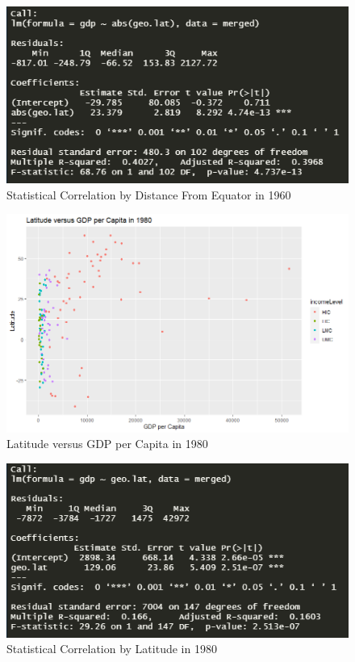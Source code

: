 \documentclass[15pt]{article}
\begin{document}
\begin{figure}[H]
    \centering
    \includegraphics[scale = 0.5]{Part1_dist_from_equator_r^2_1960.PNG}
    \caption{Statistical Correlation by Distance From Equator in 1960}
\end{figure}

\begin{figure}[H]
    \centering
    \includegraphics[scale = 0.5]{Part1_1980.png}
    \caption{Latitude versus GDP per Capita in 1980}
\end{figure}

\begin{figure}[H]
    \centering
    \includegraphics[scale = 0.5]{Part1_latitude_r^2_1980.PNG}
    \caption{Statistical Correlation by Latitude in 1980}
\end{figure}
\end{document}
